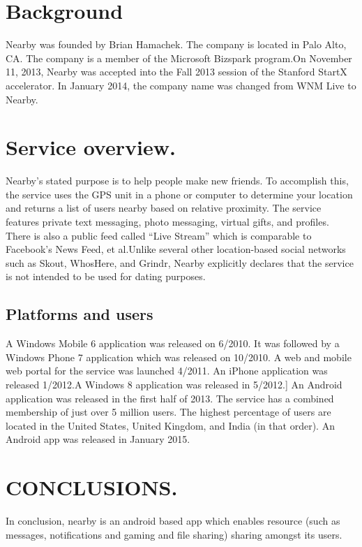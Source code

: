 \documentclass[9pt,a4paper]{article}
\begin{document}
\section{Background}

Nearby was founded by Brian Hamachek\cite{mcalexander2003using}. The company is located in Palo Alto, CA. The company is a member of the Microsoft Bizspark program.On November 11, 2013, Nearby was accepted into the Fall 2013 session of the Stanford StartX accelerator. In January 2014, the company name was changed from WNM Live to Nearby.

\section{Service overview.}

Nearby’s stated purpose is to help people make new friends. To accomplish this, the service uses the GPS unit in a phone or computer to determine your location and returns a list of users nearby based on relative proximity\cite{baumert2011system}. The service features private text messaging, photo messaging, virtual gifts, and profiles. There is also a public feed called “Live Stream” which is comparable to Facebook’s News Feed, et al.Unlike several other location-based social networks such as Skout, WhosHere, and Grindr, Nearby explicitly declares that the service is not intended to be used for dating purposes.\cite{doshi2014location}

\subsection{Platforms and users}

A Windows Mobile 6 application was released on 6/2010. It was followed by a Windows Phone 7 application which was released on 10/2010. A web and mobile web portal for the service was launched 4/2011. An iPhone application was released 1/2012.A Windows 8 application was released in 5/2012.] An Android application was released in the first half of 2013. The service has a combined membership\cite{zheng2013nearby} of just over 5 million users. The highest percentage of users are located in the United States, United Kingdom, and India (in that order). An Android app was released in January 2015.

\section{CONCLUSIONS.}
In conclusion, nearby is an android based app which enables resource (such as messages, notifications and gaming and file sharing) sharing amongst its users. \cite{harrell1997method}
\newpage


\end{document}
